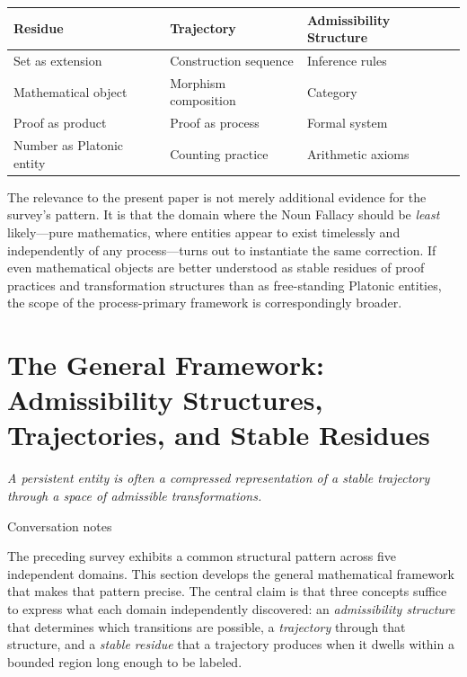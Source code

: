 \documentclass[12pt, a4paper]{article}
\theoremstyle{plain}
\theoremstyle{definition}
\theoremstyle{remark}
\begin{document}
\begin{center}
\begin{tabular}{lll}
\toprule
\textbf{Residue} & \textbf{Trajectory} & \textbf{Admissibility Structure} \\
\midrule
Set as extension & Construction sequence & Inference rules \\
Mathematical object & Morphism composition & Category \\
Proof as product & Proof as process & Formal system \\
Number as Platonic entity & Counting practice & Arithmetic axioms \\
\bottomrule
\end{tabular}
\end{center}

The relevance to the present paper is not merely additional evidence for the
survey's pattern. It is that the domain where the Noun Fallacy should be
\emph{least} likely---pure mathematics, where entities appear to exist
timelessly and independently of any process---turns out to instantiate the
same correction. If even mathematical objects are better understood as stable
residues of proof practices and transformation structures than as free-standing
Platonic entities, the scope of the process-primary framework is correspondingly
broader.

\section{The General Framework: Admissibility Structures, Trajectories,
and Stable Residues}
\label{sec:framework}

\epigraph{\textit{A persistent entity is often a compressed representation
of a stable trajectory through a space of admissible transformations.}}{Conversation notes}

\noindent
The preceding survey exhibits a common structural pattern across five
independent domains. This section develops the general mathematical framework
that makes that pattern precise. The central claim is that three concepts
suffice to express what each domain independently discovered: an
\emph{admissibility structure} that determines which transitions are possible,
a \emph{trajectory} through that structure, and a \emph{stable residue}
that a trajectory produces when it dwells within a bounded region long enough
to be labeled.
\end{document}
